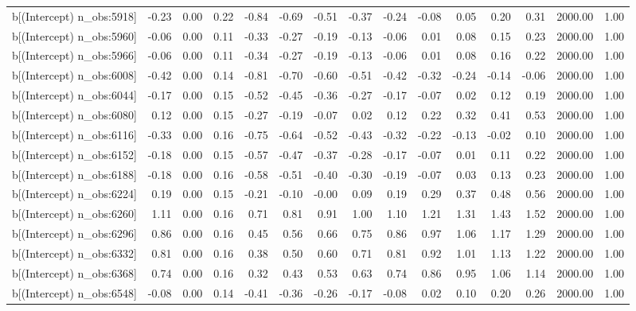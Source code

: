 \begin{table}[ht]
\begin{tabular}{rrrrrrrrrrrrrrr}
  b[(Intercept) n\_obs:5918] & -0.23 & 0.00 & 0.22 & -0.84 & -0.69 & -0.51 & -0.37 & -0.24 & -0.08 & 0.05 & 0.20 & 0.31 & 2000.00 & 1.00 \\ 
  b[(Intercept) n\_obs:5960] & -0.06 & 0.00 & 0.11 & -0.33 & -0.27 & -0.19 & -0.13 & -0.06 & 0.01 & 0.08 & 0.15 & 0.23 & 2000.00 & 1.00 \\ 
  b[(Intercept) n\_obs:5966] & -0.06 & 0.00 & 0.11 & -0.34 & -0.27 & -0.19 & -0.13 & -0.06 & 0.01 & 0.08 & 0.16 & 0.22 & 2000.00 & 1.00 \\ 
  b[(Intercept) n\_obs:6008] & -0.42 & 0.00 & 0.14 & -0.81 & -0.70 & -0.60 & -0.51 & -0.42 & -0.32 & -0.24 & -0.14 & -0.06 & 2000.00 & 1.00 \\ 
  b[(Intercept) n\_obs:6044] & -0.17 & 0.00 & 0.15 & -0.52 & -0.45 & -0.36 & -0.27 & -0.17 & -0.07 & 0.02 & 0.12 & 0.19 & 2000.00 & 1.00 \\ 
  b[(Intercept) n\_obs:6080] & 0.12 & 0.00 & 0.15 & -0.27 & -0.19 & -0.07 & 0.02 & 0.12 & 0.22 & 0.32 & 0.41 & 0.53 & 2000.00 & 1.00 \\ 
  b[(Intercept) n\_obs:6116] & -0.33 & 0.00 & 0.16 & -0.75 & -0.64 & -0.52 & -0.43 & -0.32 & -0.22 & -0.13 & -0.02 & 0.10 & 2000.00 & 1.00 \\ 
  b[(Intercept) n\_obs:6152] & -0.18 & 0.00 & 0.15 & -0.57 & -0.47 & -0.37 & -0.28 & -0.17 & -0.07 & 0.01 & 0.11 & 0.22 & 2000.00 & 1.00 \\ 
  b[(Intercept) n\_obs:6188] & -0.18 & 0.00 & 0.16 & -0.58 & -0.51 & -0.40 & -0.30 & -0.19 & -0.07 & 0.03 & 0.13 & 0.23 & 2000.00 & 1.00 \\ 
  b[(Intercept) n\_obs:6224] & 0.19 & 0.00 & 0.15 & -0.21 & -0.10 & -0.00 & 0.09 & 0.19 & 0.29 & 0.37 & 0.48 & 0.56 & 2000.00 & 1.00 \\ 
  b[(Intercept) n\_obs:6260] & 1.11 & 0.00 & 0.16 & 0.71 & 0.81 & 0.91 & 1.00 & 1.10 & 1.21 & 1.31 & 1.43 & 1.52 & 2000.00 & 1.00 \\ 
  b[(Intercept) n\_obs:6296] & 0.86 & 0.00 & 0.16 & 0.45 & 0.56 & 0.66 & 0.75 & 0.86 & 0.97 & 1.06 & 1.17 & 1.29 & 2000.00 & 1.00 \\ 
  b[(Intercept) n\_obs:6332] & 0.81 & 0.00 & 0.16 & 0.38 & 0.50 & 0.60 & 0.71 & 0.81 & 0.92 & 1.01 & 1.13 & 1.22 & 2000.00 & 1.00 \\ 
  b[(Intercept) n\_obs:6368] & 0.74 & 0.00 & 0.16 & 0.32 & 0.43 & 0.53 & 0.63 & 0.74 & 0.86 & 0.95 & 1.06 & 1.14 & 2000.00 & 1.00 \\ 
  b[(Intercept) n\_obs:6548] & -0.08 & 0.00 & 0.14 & -0.41 & -0.36 & -0.26 & -0.17 & -0.08 & 0.02 & 0.10 & 0.20 & 0.26 & 2000.00 & 1.00 \\ 

\end{tabular}
\end{table}
